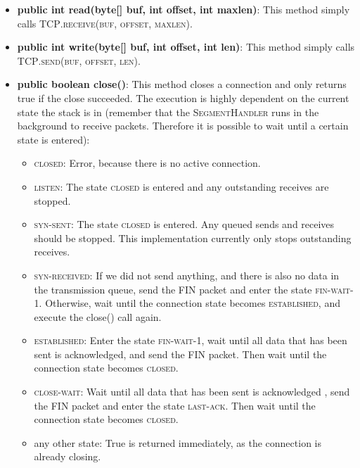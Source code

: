 \documentclass{hitec}
\newcommand{\classname}[1]{\textsc{#1}}
\newcommand{\classmethodname}[2]{\classname{#1}.\classname{#2}}
\newcommand{\state}[1]{\textsc{#1}}
\begin{document}
\begin{itemize}
   \item \textbf{public int read(byte[] buf, int offset, int maxlen)}: This method simply calls \classmethodname{TCP}{receive(buf, offset, maxlen)}.
   
   \item \textbf{public int write(byte[] buf, int offset, int len)}: This method simply calls \classmethodname{TCP}{send(buf, offset, len)}.
   
   \item \textbf{public boolean close()}: This method closes a connection and only returns true if the close succeeded. The execution is highly dependent on the current state the stack is in (remember that the \classname{SegmentHandler} runs in the background to receive packets. Therefore it is possible to wait until a certain state is entered):
   
  \begin{itemize}
    \item \state{closed}: Error, because there is no active connection. 
    \item \state{listen}: The state \state{closed} is entered and any outstanding receives are stopped.
    \item \state{syn-sent}: The state \state{closed} is entered. Any queued sends and receives should be stopped. This implementation currently only stops outstanding receives. 
    \item \state{syn-received}: If we did not send anything, and there is also no data in the transmission queue, send the FIN packet and enter the state \state{fin-wait-1}. Otherwise, wait until the connection state becomes \state{established}, and execute the close() call again.
    \item \state{established}: Enter the state \state{fin-wait-1}, wait until all data that has been sent is acknowledged, and send the FIN packet. Then wait until the connection state becomes \state{closed}.
    \item \state{close-wait}: Wait until all data that has been sent is acknowledged , send the FIN packet and enter the state \state{last-ack}. Then wait until the connection state becomes \state{closed}.
    \item any other state: True is returned immediately, as the connection is already closing.
    
  \end{itemize}
   
\end{itemize}
\end{document}
